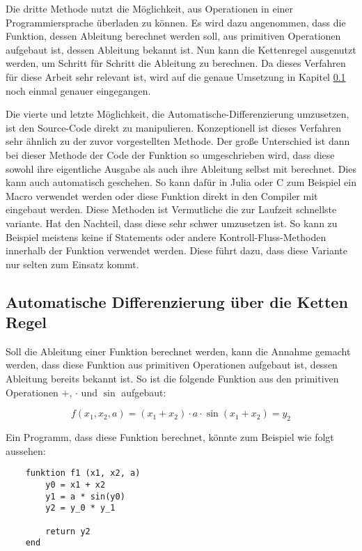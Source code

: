 Die dritte Methode nutzt die Möglichkeit, aus Operationen 
in einer Programmiersprache überladen zu können.
Es wird dazu angenommen, dass die Funktion, dessen Ableitung berechnet werden soll, aus primitiven Operationen aufgebaut ist, dessen Ableitung bekannt ist.
Nun kann die Kettenregel ausgenutzt werden, um Schritt für Schritt die Ableitung zu berechnen.
Da dieses Verfahren für diese Arbeit sehr relevant ist, wird auf die genaue Umsetzung in Kapitel \ref{sec:ketten_regel} noch einmal genauer eingegangen.

Die vierte und letzte Möglichkeit, die Automatische-Differenzierung umzusetzen, ist den Source-Code direkt zu manipulieren.
Konzeptionell ist dieses Verfahren sehr ähnlich zu der zuvor vorgestellten Methode. 
Der große Unterschied ist dann bei dieser Methode der Code der Funktion so umgeschrieben wird, 
dass diese sowohl ihre eigentliche Ausgabe als auch ihre Ableitung selbst mit berechnet.
Dies kann auch automatisch geschehen.
So kann dafür in Julia oder C zum Beispiel ein Macro verwendet werden oder diese Funktion direkt in den Compiler mit eingebaut werden.
Diese Methoden ist Vermutliche die zur Laufzeit schnellste variante.
Hat den Nachteil, dass diese sehr schwer umzusetzen ist.
So kann zu Beispiel meistens keine if Statements oder andere Kontroll-Fluss-Methoden innerhalb der Funktion verwendet werden. 
Diese führt dazu, dass diese Variante nur selten zum Einsatz kommt.

\subsection{Automatische Differenzierung über die Ketten Regel} \label{sec:ketten_regel}

Soll die Ableitung einer Funktion berechnet werden, 
kann die Annahme gemacht werden, 
dass diese Funktion aus primitiven Operationen aufgebaut ist, dessen Ableitung bereits bekannt ist.
So ist die folgende Funktion aus den primitiven Operationen $+$, $\cdot$ und $\sin$ aufgebaut:

$$
f(x_1, x_2, a) = (x_1 + x_2) \cdot a \cdot \sin(x_1 + x_2) = y_2
$$

Ein Programm, dass diese Funktion berechnet, könnte zum Beispiel wie folgt aussehen:

\begin{lstlisting}
    funktion f1 (x1, x2, a)
        y0 = x1 + x2
        y1 = a * sin(y0)
        y2 = y_0 * y_1
        
    	return y2
    end
\end{lstlisting}

